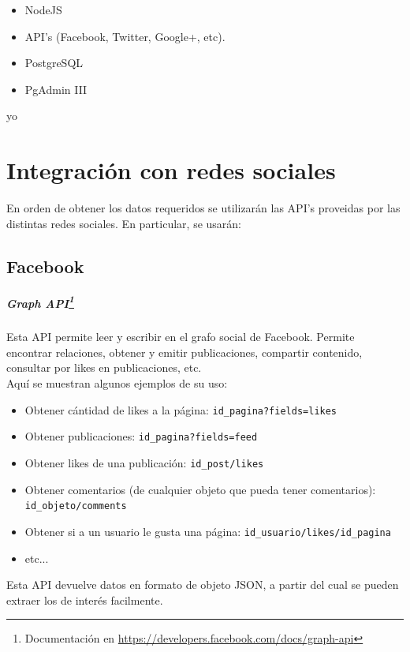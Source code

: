 \documentclass[oneside]{book}
\begin{document}
	\begin{itemize}
		\item NodeJS
		\item API's (Facebook, Twitter, Google+, etc).
		\item PostgreSQL
		\item PgAdmin III
	\end{itemize}
	
yo
\newpage



\section{Integración con redes sociales}

En orden de obtener los datos requeridos se utilizarán las API's proveidas por las distintas redes sociales. En particular, se usarán:

\subsection{Facebook}


	\subparagraph*{Graph API\footnote{Documentaci\'{o}n en \url{https://developers.facebook.com/docs/graph-api}}}
	
	Esta API permite leer y escribir en el grafo social de Facebook.
	Permite encontrar relaciones, obtener y emitir publicaciones, compartir contenido, consultar por likes en publicaciones, etc.\\
	
	Aqu\'{i} se muestran algunos ejemplos de su uso:\\
	
	\begin{itemize}
  		\item Obtener c\'{a}ntidad de likes a la p\'{a}gina: \texttt{id\_pagina?fields=likes}
  		\item Obtener publicaciones: \texttt{id\_pagina?fields=feed}
  		\item Obtener likes de una publicaci\'{o}n: \texttt{id\_post/likes}
  		\item Obtener comentarios (de cualquier objeto que pueda tener comentarios): \texttt{id\_objeto/comments}
  		\item Obtener si a un usuario le gusta una p\'{a}gina: \texttt{id\_usuario/likes/id\_pagina}
  		\item etc...
	\end{itemize}
	
	Esta API devuelve datos en formato de objeto JSON, a partir del cual se pueden extraer los de inter\'{e}s facilmente.
	
\end{document}
